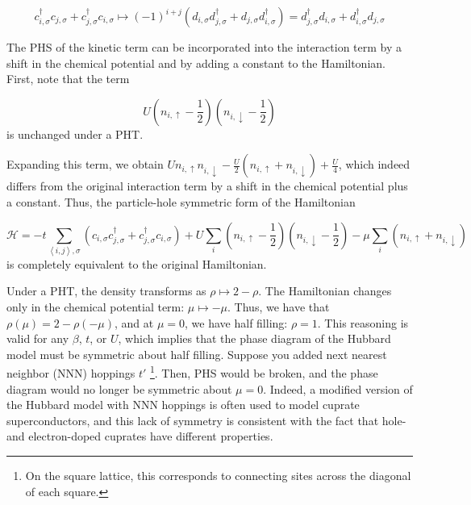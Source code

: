 \begin{equation}
c_{i, \sigma}^\dagger c_{j, \sigma} + c_{j, \sigma}^\dagger c_{i, \sigma} \mapsto (-1)^{i+j} ( d_{i, \sigma} d_{j, \sigma}^\dagger + d_{j, \sigma} d_{i, \sigma}^\dagger ) = d_{j, \sigma}^\dagger d_{i, \sigma} + d_{i, \sigma}^\dagger d_{j, \sigma}
\end{equation}

The \ac{PHS} of the kinetic term can be incorporated into the interaction term by a shift in the chemical potential and by adding a constant to the Hamiltonian.
First, note that the term

\begin{equation*}
U ( n_{i,\uparrow} - \frac{1}{2} ) ( n_{i,\downarrow} - \frac{1}{2} )
\end{equation*}
is unchanged under a \ac{PHT}.

Expanding this term, we obtain $U n_{i,\uparrow} n_{i,\downarrow} - \frac{U}{2} (n_{i,\uparrow} + n_{i,\downarrow}) + \frac{U}{4}$, which indeed differs from the original interaction term by a shift in the chemical potential plus a constant.
Thus, the particle-hole symmetric form of the Hamiltonian 

\begin{equation}
\mathcal{H} = -t \sum_{\left\langle i, j \right \rangle, \sigma} ( c_{i,\sigma} c_{j,\sigma}^\dagger + c_{j,\sigma}^\dagger c_{i,\sigma} ) + U \sum_{i} ( n_{i,\uparrow} - \frac{1}{2} ) ( n_{i,\downarrow} - \frac{1}{2} ) -\mu \sum_i ( n_{i,\uparrow} + n_{i,\downarrow} )
\end{equation}
is completely equivalent to the original Hamiltonian.

Under a \ac{PHT}, the density transforms as $\rho \mapsto 2 - \rho$.
The Hamiltonian changes only in the chemical potential term: $\mu \mapsto -\mu$.
Thus, we have that $\rho (\mu) = 2 - \rho (-\mu)$, and at $\mu = 0$, we have half filling: $\rho = 1$.
This reasoning is valid for any $\beta$, $t$, or $U$, which implies that the phase diagram of the Hubbard model must be symmetric about half filling.
Suppose you added next nearest neighbor (NNN) hoppings $t'$ \footnote{On the square lattice, this corresponds to connecting sites across the diagonal of each square.}.
Then, PHS would be broken, and the phase diagram would no longer be symmetric about $\mu = 0$.
Indeed, a modified version of the Hubbard model with NNN hoppings is often used to model cuprate superconductors, and this lack of symmetry is consistent with the fact that hole- and electron-doped cuprates have different properties. 